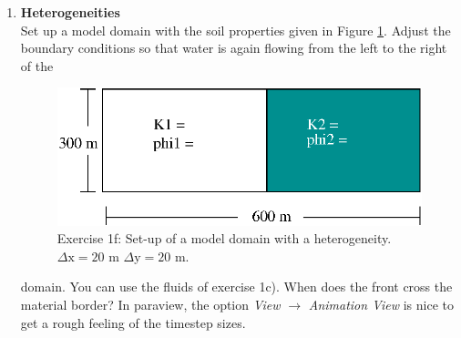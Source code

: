 \begin{enumerate}
\item \textbf{Heterogeneities}  \\
  Set up a model domain with the soil properties given in Figure
  \ref{tutorial-coupled:exercise1_d}. Adjust the boundary conditions
  so that water is again flowing from the left to the right of the
\begin{figure}[h]
\centering
\includegraphics[width=0.5\linewidth,keepaspectratio]{EPS/exercise1_c.eps}
\caption{Exercise 1f: Set-up of a model domain with a heterogeneity. $\Delta \text{x} = 20$ m $\Delta \text{y} = 20$ m.}\label{tutorial-coupled:exercise1_d}
\end{figure}
domain. You can use the fluids of exercise 1c). 
When does the front cross the material border? In paraview, the option \textit{View} $\rightarrow$ \textit{Animation View} is nice to get a rough feeling of the timestep sizes.
\end{enumerate}

